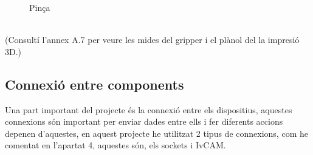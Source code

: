 ﻿\documentclass[10pt,a4paper,twocolumn,twoside]{article}
\begin{document}
\begin{figure}[!h]
 \centering
 \caption{Pinça}
 \label{f:gripper}
\end{figure}

 \hfill \break
\\

(Consultí l’annex A.7 per veure les mides del gripper i el plànol del la impresió 3D.)

\subsection{Connexió entre components}

Una part important del projecte és la connexió entre els dispositius, aquestes connexions són important per enviar dades entre ells i fer diferents accions depenen d'aquestes, en aquest projecte he utilitzat 2 tipus de connexions, com he comentat en l'apartat 4, aquestes són, els sockets i IvCAM.
\\
\end{document}
